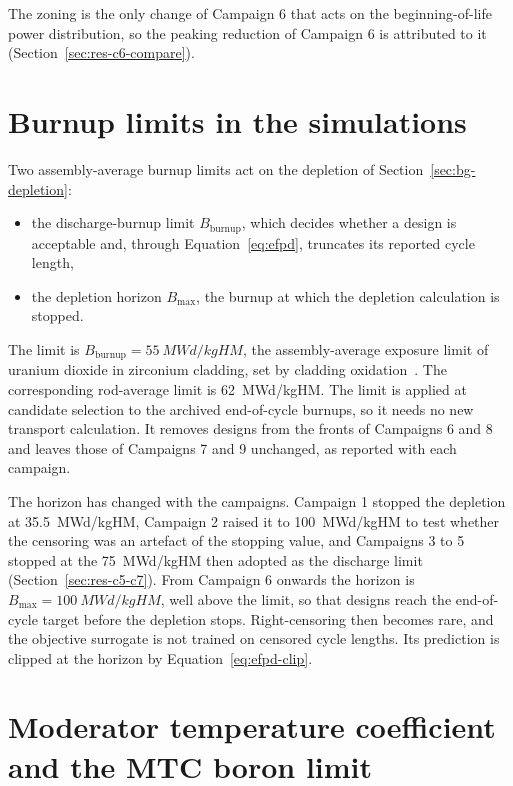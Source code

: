 The zoning is the only change of Campaign 6 that acts on the
beginning-of-life power distribution, so the peaking reduction of
Campaign 6 is attributed to it (Section~\ref{sec:res-c6-compare}).
\section{Burnup limits in the simulations}
\label{sec:meth-atf}

Two assembly-average burnup limits act on the depletion of
Section~\ref{sec:bg-depletion}:

\begin{itemize}
  \item the discharge-burnup limit $B_\mathrm{burnup}$, which decides
        whether a design is acceptable and, through
        Equation~\eqref{eq:efpd}, truncates its reported cycle length,

  \item the depletion horizon $B_\mathrm{max}$, the burnup at which the
        depletion calculation is stopped.
\end{itemize}

The limit is $B_\mathrm{burnup} = \SI{55}{MWd/kgHM}$, the
assembly-average exposure limit of uranium dioxide in zirconium
cladding, set by cladding oxidation~\cite{song_sanchez_2026,alam_2019_hotchannel}.
The corresponding rod-average limit is \SI{62}{MWd/kgHM}. The limit is
applied at candidate selection to
the archived end-of-cycle burnups, so it needs no new transport
calculation. It removes designs from the fronts of Campaigns 6 and 8
and leaves those of Campaigns 7 and 9 unchanged, as reported with each
campaign.

The horizon has changed with the campaigns. Campaign 1 stopped the
depletion at \SI{35.5}{MWd/kgHM}, Campaign 2 raised it to
\SI{100}{MWd/kgHM} to test whether the censoring was an artefact of the
stopping value, and Campaigns 3 to 5 stopped at the \SI{75}{MWd/kgHM}
then adopted as the discharge limit
(Section~\ref{sec:res-c5-c7}). From Campaign 6 onwards the horizon is
$B_\mathrm{max} = \SI{100}{MWd/kgHM}$, well above the limit, so that
designs reach the end-of-cycle target before the depletion stops. Right-censoring then becomes rare, and
the objective surrogate is not trained on censored cycle lengths. Its prediction is
clipped at the horizon by Equation~\eqref{eq:efpd-clip}.

\section{Moderator temperature coefficient and the MTC boron limit}
\label{sec:meth-mtc}


